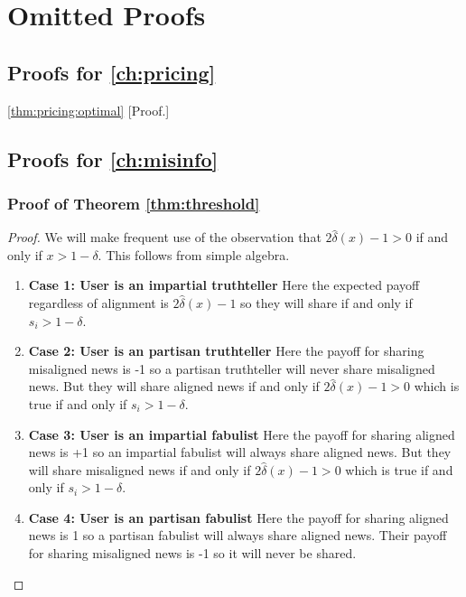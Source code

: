 \chapter{Omitted Proofs}
\label{app:proofs}

\section{Proofs for \texorpdfstring{\cref{ch:pricing}}{Chapter 2}}
\label{app:proofs:pricing}

\begin{proofof}{\cref{thm:pricing:optimal}}
[Proof.]
\end{proofof}

\section{Proofs for \texorpdfstring{\cref{ch:misinfo}}{Chapter 3}}
\label{app:proofs:misinfo}

\subsection{Proof of Theorem \ref{thm:threshold} }
\begin{proof}
    We will make frequent use of the observation that $2 \hat{\delta}(x) -1>0$ if and only if $x > 1 -\delta$. This follows from simple algebra. 
    \begin{enumerate}
        \item{\textbf{Case 1: User is an impartial truthteller}} 
         Here the expected payoff regardless of alignment is $2 \hat{\delta}(x) -1$ so they will share if and only if $s_i > 1-\delta$.  
         \item{\textbf{Case 2: User is an partisan truthteller}} 
         Here the payoff for sharing misaligned news is -1 so a partisan truthteller will never share misaligned news. But they will share aligned news if and only if $2 \hat{\delta}(x) -1>0$ which is true if and only if $s_i > 1 -\delta$. 
         \item{\textbf{Case 3: User is an impartial fabulist}} 
         Here the payoff for sharing aligned news is +1 so an impartial fabulist will always share aligned news. But they will share misaligned news if and only if $2 \hat{\delta}(x) -1>0$ which is true if and only if $s_i > 1 -\delta$. 
        \item{\textbf{Case 4: User is an partisan fabulist}} 
         Here the payoff for sharing aligned news is 1 so a partisan fabulist will always share aligned news. Their payoff for sharing misaligned news is -1 so it will never be shared.
    \end{enumerate}
     

\end{proof}




